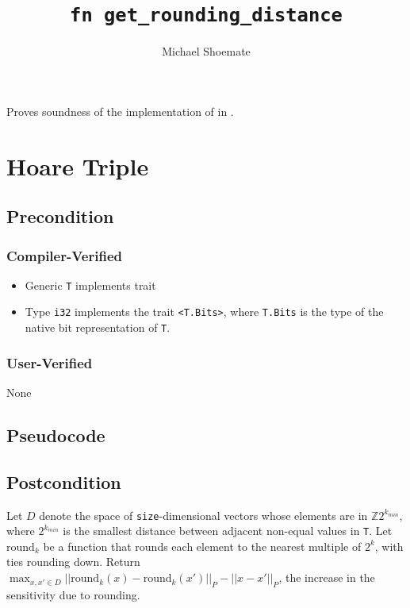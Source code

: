 \documentclass{article}
\title{\texttt{fn get\_rounding\_distance}}
\author{Michael Shoemate}
\date{}
\begin{document}
\maketitle

\contrib
Proves soundness of the implementation of  in .

\section{Hoare Triple}
\subsection*{Precondition}
\subsubsection*{Compiler-Verified}

\begin{itemize}
    \item Generic \texttt{T} implements trait 
    \item Type \texttt{i32} implements the trait \texttt{<T.Bits>},
        where \texttt{T.Bits} is the type of the native bit representation of \texttt{T}.
\end{itemize}

\subsubsection*{User-Verified}
None

\subsection*{Pseudocode}


\subsection*{Postcondition}
\begin{theorem}
    Let $D$ denote the space of \texttt{size}-dimensional vectors whose elements are in $\mathbb{Z} 2^{k_{min}}$,
    where $2^{k_{min}}$ is the smallest distance between adjacent non-equal values in \texttt{T}.
    Let $\mathrm{round}_k$ be a function that rounds each element to the nearest multiple of $2^k$,
    with ties rounding down.
    Return $\max_{x, x' \in D} ||\mathrm{round}_k(x) - \mathrm{round}_k(x')||_P - ||x - x'||_P$,
    the increase in the sensitivity due to rounding.
\end{theorem}
\end{document}
